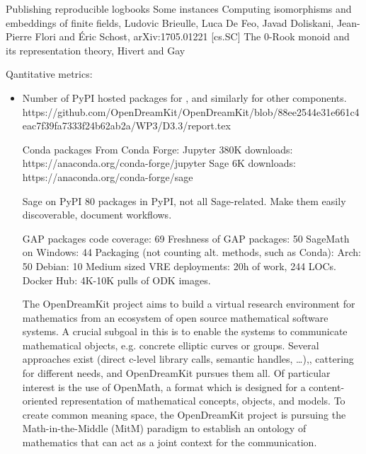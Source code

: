 \begin{Aim 1}
\begin{Aim 2}
Publishing reproducible logbooks %
    Some instances
    Computing isomorphisms and embeddings of finite fields, Ludovic Brieulle, Luca De Feo, Javad Doliskani, Jean-Pierre Flori and Éric 
    Schost, arXiv:1705.01221 [cs.SC] 
    The 0-Rook monoid and its representation theory, Hivert and Gay
     

Qantitative metrics:
    \begin{itemize}
    \item Number of PyPI hosted packages for \Sage, and similarly for other components.
     https://github.com/OpenDreamKit/OpenDreamKit/blob/88ee2544e31e661c4eac7f39fa7333f24b62ab2a/WP3/D3.3/report.tex
  
  Conda packages
      From Conda Forge:
      Jupyter 380K downloads: https://anaconda.org/conda-forge/jupyter
      Sage 6K downloads: https://anaconda.org/conda-forge/sage

      Sage on PyPI
      80 packages in PyPI, not all Sage-related.
      Make them easily discoverable, document workflows.


    GAP packages code coverage: 69%
    Freshness of GAP packages: 50%
    SageMath on Windows: 44%
    Packaging (not counting alt. methods, such as Conda):
    Arch: 50%
    Debian: 10%
    Medium sized VRE deployments: 20h of work, 244 LOCs.
    Docker Hub: 4K-10K pulls of ODK images.

The OpenDreamKit project aims to build a virtual research environment for mathematics from an ecosystem of open source mathematical software 
systems. A crucial subgoal in this is to enable the systems to communicate mathematical objects, e.g. concrete elliptic curves or groups.
Several approaches exist (direct c-level library calls, semantic handles, …),, cattering for different needs, and OpenDreamKit pursues them 
all. Of particular interest is the use of OpenMath, a format which is designed for a content-oriented representation of mathematical 
concepts, objects, and models. To create common meaning space, the OpenDreamKit project is pursuing the Math-in-the-Middle (MitM) paradigm 
to establish an ontology of mathematics that can act as a joint context for the communication.


\end{itemize}
\end{Aim 2}
\end{Aim 1}
